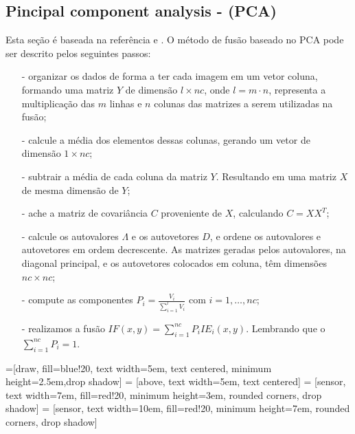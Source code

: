\documentclass[conference]{IEEEtran}
\begin{document}
\subsection{Pincipal component analysis - (PCA) }
Esta seção é baseada na referência \cite{n_r} e \cite{mit}. O método de fusão baseado no PCA pode ser descrito pelos seguintes passos:
\begin{itemize}
\item[-] organizar os dados de forma a ter cada imagem em um vetor coluna, formando uma matriz $Y$ de dimensão $l\times nc$, onde $l=m\cdot n$, representa a multiplicação das $m$ linhas e $n$ colunas das matrizes a serem utilizadas na fusão;
\item[-] calcule a média dos elementos dessas colunas, gerando um vetor de dimensão $1\times nc$;
\item[-] subtrair a média de cada coluna da matriz $Y$. Resultando em uma matriz $X$ de mesma dimensão de $Y$; 
\item[-] ache a matriz de covariância $C$ proveniente de $X$, calculando $C=XX^T$;
\item[-] calcule os autovalores $\Lambda$ e os autovetores $D$, e ordene os autovalores e autovetores em ordem decrescente. As matrizes geradas pelos autovalores, na diagonal principal, e os autovetores colocados em coluna, têm dimensões $nc\times nc$;
\item[-] compute as componentes $P_i=\frac{V_i}{\sum_{i=1}^l V_i}$ com $i=1,\dots,nc$;
\item[-] realizamos a fusão $IF(x,y)=\sum_{i=1}^{nc}P_iIE_i(x,y)$. Lembrando que o $\sum_{i=1}^{nc}P_i=1$.
\end{itemize}
=[draw, fill=blue!20, text width=5em, 
    text centered, minimum height=2.5em,drop shadow]
 = [above, text width=5em, text centered]
 = [sensor, text width=7em, fill=red!20, 
    minimum height=3em, rounded corners, drop shadow]
 = [sensor, text width=10em, fill=red!20, 
    minimum height=7em, rounded corners, drop shadow]
\def\blockdist{2.3}
\def\edgedist{2.5}
\end{document}
